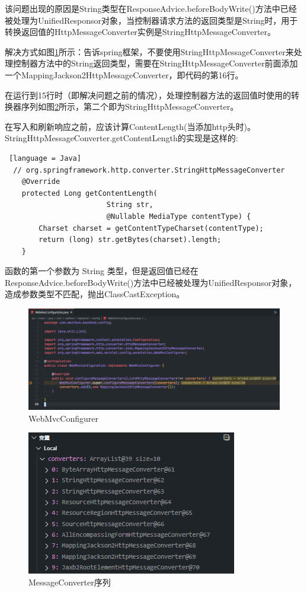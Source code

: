 该问题出现的原因是String类型在ResponseAdvice.beforeBodyWrite()方法中已经被处理为UnifiedResponsor对象，当控制器请求方法的返回类型是String时，用于转换返回值的HttpMessageConverter实例是StringHttpMessageConverter。

解决方式如图\ref{WebMvcConfigurer}所示：告诉spring框架，不要使用StringHttpMessageConverter来处理控制器方法中的String返回类型，需要在StringHttpMessageConverter前面添加一个MappingJackson2HttpMessageConverter，即代码的第16行。

在运行到15行时（即解决问题之前的情况），处理控制器方法的返回值时使用的转换器序列如图\ref{MessageConverter-list}所示，第二个即为StringHttpMessageConverter。

在写入和刷新响应之前，应该计算ContentLength(当添加http头时)。StringHttpMessageConverter.getContentLength的实现是这样的:
\begin{lstlisting} [language = Java]
  // org.springframework.http.converter.StringHttpMessageConverter
	@Override
	protected Long getContentLength(
                        String str, 
                        @Nullable MediaType contentType) {
		Charset charset = getContentTypeCharset(contentType);
		return (long) str.getBytes(charset).length;
	}
\end{lstlisting}

函数的第一个参数为 String 类型，但是返回值已经在ResponseAdvice.beforeBodyWrite()方法中已经被处理为UnifiedResponsor对象，造成参数类型不匹配，抛出ClassCastException。

\begin{figure}[H]
  \centering
  \includegraphics[scale = 0.6]{out/figure/统一返回对象/WebMvcConfiguration-MessageConverter-Code.png}
  \caption{\song\wuhao WebMvcConfigurer}
  \label{WebMvcConfigurer}
\end{figure}

\begin{figure}[H]
  \centering
  \includegraphics[scale = 0.8]{out/figure/统一返回对象/WebMvcConfiguration-MessageConverter-debug.png}
  \caption{\song\wuhao MessageConverter序列}
  \label{MessageConverter-list}
\end{figure}

